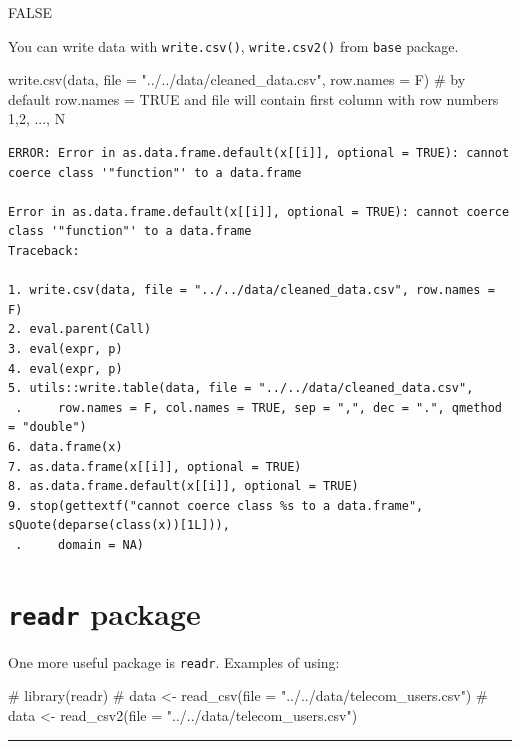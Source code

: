 \documentclass[
  letterpaper,
  DIV=11,
  numbers=noendperiod]{scrreprt}
\newenvironment{Shaded}{\begin{snugshade}}{\end{snugshade}}
\newcommand{\AttributeTok}[1]{\textcolor[rgb]{0.40,0.45,0.13}{#1}}
\newcommand{\CommentTok}[1]{\textcolor[rgb]{0.37,0.37,0.37}{#1}}
\newcommand{\FunctionTok}[1]{\textcolor[rgb]{0.28,0.35,0.67}{#1}}
\newcommand{\NormalTok}[1]{\textcolor[rgb]{0.00,0.23,0.31}{#1}}
\newcommand{\StringTok}[1]{\textcolor[rgb]{0.13,0.47,0.30}{#1}}
\begin{document}
FALSE

You can write data with \texttt{write.csv()}, \texttt{write.csv2()} from
\texttt{base} package.

\begin{Shaded}
\begin{Highlighting}[]
\FunctionTok{write.csv}\NormalTok{(data, }\AttributeTok{file =} \StringTok{"../../data/cleaned\_data.csv"}\NormalTok{, }\AttributeTok{row.names =}\NormalTok{ F)}
\CommentTok{\# by default row.names = TRUE and file will contain first column with row numbers 1,2, ..., N}
\end{Highlighting}
\end{Shaded}

\begin{verbatim}
ERROR: Error in as.data.frame.default(x[[i]], optional = TRUE): cannot coerce class '"function"' to a data.frame

Error in as.data.frame.default(x[[i]], optional = TRUE): cannot coerce class '"function"' to a data.frame
Traceback:

1. write.csv(data, file = "../../data/cleaned_data.csv", row.names = F)
2. eval.parent(Call)
3. eval(expr, p)
4. eval(expr, p)
5. utils::write.table(data, file = "../../data/cleaned_data.csv", 
 .     row.names = F, col.names = TRUE, sep = ",", dec = ".", qmethod = "double")
6. data.frame(x)
7. as.data.frame(x[[i]], optional = TRUE)
8. as.data.frame.default(x[[i]], optional = TRUE)
9. stop(gettextf("cannot coerce class %s to a data.frame", sQuote(deparse(class(x))[1L])), 
 .     domain = NA)
\end{verbatim}

\section{\texorpdfstring{\texttt{readr}
package}{readr package}}\label{readr-package}

One more useful package is \texttt{readr}. Examples of using:

\begin{Shaded}
\begin{Highlighting}[]
\CommentTok{\# library(readr)}
\CommentTok{\# data \textless{}{-} read\_csv(file = "../../data/telecom\_users.csv")}
\CommentTok{\# data \textless{}{-} read\_csv2(file = "../../data/telecom\_users.csv")\textasciigrave{}}
\end{Highlighting}
\end{Shaded}

\begin{center}\rule{0.5\linewidth}{0.5pt}\end{center}
\end{document}
